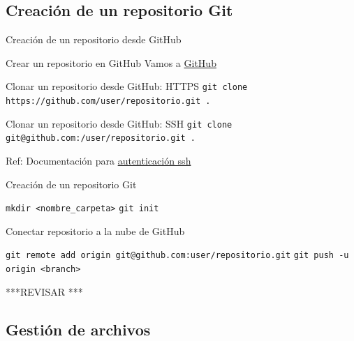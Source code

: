 \documentclass{beamer}
\begin{document}
\subsection {Creación de un repositorio Git}
  
\begin{frame}[containsverbatim]{Creación de un repositorio desde GitHub}

\begin{block}{Crear un repositorio en GitHub}
  Vamos a \href{https://github.com}{GitHub} 
\end{block}


\begin{block}{Clonar un repositorio desde GitHub: HTTPS}
  \small
  \texttt{git clone https://github.com/user/repositorio.git .}
\end{block}

\begin{block}{Clonar un repositorio desde GitHub: SSH}
  \small
  \texttt{git clone git@github.com:/user/repositorio.git .}
\end{block}

Ref: Documentación para \href{https://docs.github.com/es/authentication/connecting-to-github-with-ssh/about-ssh}{autenticación ssh}

\end{frame}


\begin{frame}[containsverbatim] {Creación de un repositorio Git}  

\begin{block}{}

  \texttt{mkdir <nombre\_carpeta>}
  \texttt{git init}

\end{block}

\begin{block}{Conectar repositorio a la nube de GitHub}

  \texttt{git remote add origin git@github.com:user/repositorio.git}
  \texttt{git push -u origin <branch>}

\end{block}

***REVISAR *** 

\end{frame}

\subsection {Gestión de archivos}
\end{document}

